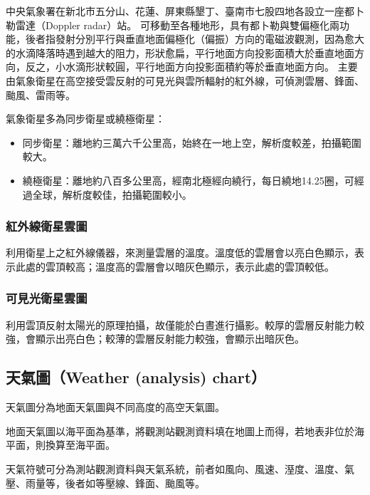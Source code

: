 \documentclass[a4paper,12pt]{report}
\begin{document}
\begin{itemize}
中央氣象署在新北市五分山、花蓮、屏東縣墾丁、臺南市七股四地各設立一座都卜勒雷達（Doppler radar）站。
可移動至各種地形，具有都卜勒與雙偏極化兩功能，後者指發射分別平行與垂直地面偏極化（偏振）方向的電磁波觀測，因為愈大的水滴降落時遇到越大的阻力，形狀愈扁，平行地面方向投影面積大於垂直地面方向，反之，小水滴形狀較圓，平行地面方向投影面積約等於垂直地面方向。
\bct\bfH\ctr{}\ef\FB\ect
{}
主要由氣象衛星在高空接受雲反射的可見光與雲所輻射的紅外線，可偵測雲層、鋒面、颱風、雷雨等。

氣象衛星多為同步衛星或繞極衛星：
\begin{itemize}
\item 同步衛星：離地約三萬六千公里高，始終在一地上空，解析度較差，拍攝範圍較大。
\item 繞極衛星：離地約八百多公里高，經南北極經向繞行，每日繞地14.25圈，可經過全球，解析度較佳，拍攝範圍較小。
\end{itemize}
\subsubsection{紅外線衛星雲圖}
利用衛星上之紅外線儀器，來測量雲層的溫度。溫度低的雲層會以亮白色顯示，表示此處的雲頂較高；溫度高的雲層會以暗灰色顯示，表示此處的雲頂較低。
\subsubsection{可見光衛星雲圖}
利用雲頂反射太陽光的原理拍攝，故僅能於白晝進行攝影。較厚的雲層反射能力較強，會顯示出亮白色；較薄的雲層反射能力較強，會顯示出暗灰色。
\subsection{天氣圖（Weather (analysis) chart）}
天氣圖分為地面天氣圖與不同高度的高空天氣圖。

地面天氣圖以海平面為基準，將觀測站觀測資料填在地圖上而得，若地表非位於海平面，則換算至海平面。

天氣符號可分為測站觀測資料與天氣系統，前者如風向、風速、溼度、溫度、氣壓、雨量等，後者如等壓線、鋒面、颱風等。


\end{itemize}
\end{document}
